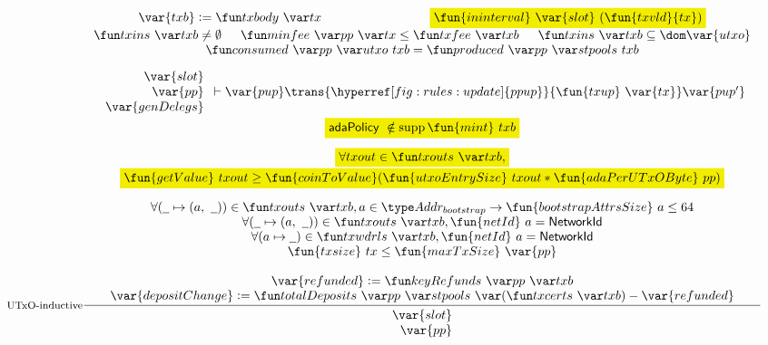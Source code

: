 \begin{figure}[htb]
  \begin{equation}\label{eq:utxo-inductive-shelley}
    \inference[UTxO-inductive]
    { \var{txb}\leteq\txbody{tx}
      & \hldiff{\fun{ininterval}~\var{slot}~(\fun{txvld}{tx})}
      \\ \txins{txb} \neq \emptyset
      & \minfee{pp}{tx} \leq \txfee{txb}
      & \txins{txb} \subseteq \dom \var{utxo}
      \\
      \consumed{pp}{utxo}~{txb} = \produced{pp}{stpools}~{txb}
      \\
      ~
      \\
      {
        \begin{array}{r}
          \var{slot} \\
          \var{pp} \\
          \var{genDelegs} \\
        \end{array}
      }
      \vdash \var{pup} \trans{\hyperref[fig:rules:update]{ppup}}{\fun{txup}~\var{tx}} \var{pup'}
      \\
      ~
      \\
      \hldiff{\mathsf{adaPolicy}~\notin \supp{\fun{mint}~txb}} \\
      ~\\
      \hldiff{\forall txout \in \txouts{txb},} \\
      \hldiff{\fun{getValue}~txout \geq \fun{coinToValue}(\fun{utxoEntrySize}~{txout} * \fun{adaPerUTxOByte}~pp)} \\~
      \\
      \forall (\wcard\mapsto (a,~\wcard)) \in \txouts{txb}, a \in \AddrBS \to \fun{bootstrapAttrsSize}~a \leq 64
      \\
      \forall (\wcard\mapsto (a,~\wcard)) \in \txouts{txb}, \fun{netId}~a =\NetworkId
      \\
      \forall (a\mapsto\wcard) \in \txwdrls{txb}, \fun{netId}~a =\NetworkId
      \\
      \fun{txsize}~{tx}\leq\fun{maxTxSize}~\var{pp}
      \\
      ~
      \\
      \var{refunded} \leteq \keyRefunds{pp}{txb}
      \\
      \var{depositChange} \leteq
        \totalDeposits{pp}{stpools}{(\txcerts{txb})} - \var{refunded}
    }
    {
      \begin{array}{r}
        \var{slot}\\
        \var{pp}\\

\end{array}}
\end{equation}
\end{figure}
